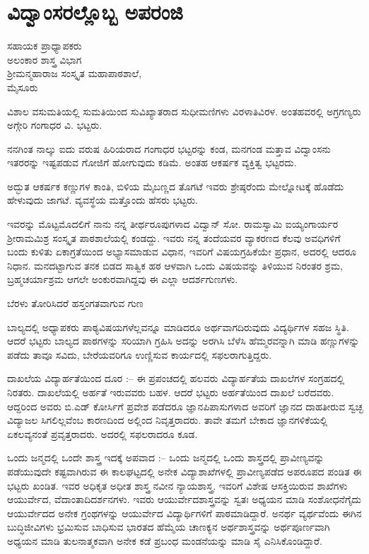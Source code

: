 \chapter{ವಿದ್ವಾಂಸರಲ್ಲೊಬ್ಬ ಅಪರಂಜಿ}

\begin{center}
\smallskip

ಸಹಾಯಕ ಪ್ರಾಧ್ಯಾಪಕರು\\
ಅಲಂಕಾರ ಶಾಸ್ತ್ರ ವಿಭಾಗ\\
ಶ್ರೀಮನ್ಮಹಾರಾಜ ಸಂಸ್ಕೃತ ಮಹಾಪಾಠಶಾಲೆ,\\ 
ಮೈಸೂರು
\addrule
\end{center}

ವಿಶಾಲ ವಸುಮತಿಯಲ್ಲಿ ಸುಮತಿಯಿಂದ ಸುವಿಖ್ಯಾತರಾದ ಸುಧೀಮಣಿಗಳು ವಿರಳಾತಿವಿರಳ.  ಅಂತಹವರಲ್ಲಿ ಅಗ್ರಗಣ್ಯರು ಅಗ್ಗೇರಿ ಗಂಗಾಧರ ವಿ. ಭಟ್ಟರು.

ನನಗಿಂತ ನಾಲ್ಕು ಐದು ವರುಷ ಹಿರಿಯರಾದ ಗಂಗಾಧರ ಭಟ್ಟರನ್ನು ಕಂಡ, ಮನಗಂಡ ಮತ್ತಾವ ವಿದ್ವಾಂಸನು ಇತರರನ್ನು ಇಷ್ಟಪಡುವ ಗೋಜಿಗೆ ಹೋಗುವುದು ಕಡಿಮೆ.  ಅಂತಹ ಆಕರ್ಷಕ ವ್ಯಕ್ತಿತ್ವ ಭಟ್ಟರದು.

ಅದ್ಭುತ ಆಕರ್ಷಕ ಕಣ್ಣುಗಳ ಕಾಂತಿ, ಬಿಳಿಯ ಮೈಬಣ್ಣದ ತೊಗಟೆ ಇವರು ಶ್ರೇಷ್ಠರೆಂದು  ಮೇಲ್ನೋಟಕ್ಕೆ ಹೊಡೆದು ಹೇಳುವುದು ಜಾಗಟೆ. ವ್ಯವಸ್ಥೆಯ ಮತ್ತೊಂದು ಹೆಸರು ಭಟ್ಟರು.

ಇವರನ್ನು ಮೊಟ್ಟಮೊದಲಿಗೆ ನಾನು ನನ್ನ ತೀರ್ಥರೂಪುಗಳಾದ ವಿದ್ವಾನ್ ಸೋ. ರಾಮಸ್ವಾಮಿ ಐಯ್ಯಂಗಾರ್ಯರ ಶ್ರೀರಾಮಮಿಶ್ರ ಸಂಸ್ಕೃತ ಪಾಠಶಾಲೆಯಲ್ಲಿ ಕಂಡದ್ದು.  ಇವರು ನನ್ನ ತಂದೆಯವರ ವ್ಯಾಕರಣದ ಕೆಲವು ಅವಧಿಗಳಿಗೆ ಬಂದು ಕುಳಿತು ಏಕಾಗ್ರತೆಯಿಂದ ಅಭ್ಯಾಸಮಾಡುವ ವಿಧಾನ, ಇವರಿಗೆ ವಿಷಯಗ್ರಹಿಕೆಯೇ ಪ್ರಧಾನ, ಅದರಲ್ಲಿ ಆದರೂ ನಿಧಾನ. ಮನದಟ್ಟಾಗುವ ತನಕ ಬಿಡದ ಸಾತ್ವಿಕ ಹಠ ಆಳವಾಗಿ ಒಂದು ವಿಷಯವನ್ನು ತಿಳಿಯುವ ನಿರಂತರ ಶ್ರಮ, ಬ್ರಹ್ಮಚರ್ಯಾಶ್ರಮ ಆಗಲೇ ಅಂಕುರವಾಗಿದ್ದವು ಈ ಎಲ್ಲಾ ಆದರ್ಶಗುಣಗಳು.

ಬೆರಳು ತೋರಿಸಿದರೆ ಹಸ್ತಂಗತವಾಗುವ ಗುಣ

ಬಾಲ್ಯದಲ್ಲಿ ಅಧ್ಯಾಪಕರು ಪಾಠ್ಯವಿಷಯಗಳೆಲ್ಲವನ್ನೂ ಮಾಡಿದರೂ ಅರ್ಥವಾಗದಿರುವುದು ವಿದ್ಯರ್ಥಿಗಳ ಸಹಜ ಸ್ಥಿತಿ.  ಆದರೆ ಭಟ್ಟರು ಬಾಲ್ಯದ ಪಾಠಗಳನ್ನು ಸರಿಯಾಗಿ ಗ್ರಹಿಸಿ ಅದನ್ನು ಅರಗಿಸಿ ಬೆಳೆಸಿ ಹೆಮ್ಮರವನ್ನಾಗಿ ಮಾಡಿ ಹಣ್ಣುಗಳನ್ನು ಪಡೆದು ತಾವೂ ಸವಿದು, ಬೇರೆಯವರಿಗೂ ಉಣ್ಣಿಸುವ ಕಾರ್ಯದಲ್ಲಿ ಸಫಲರಾಗುತ್ತಿದ್ದರು.

ದಾಖಲೆಯ ವಿದ್ಯಾರ್ಹತೆಯಿಂದ ದೂರ :– ಈ ಪ್ರಪಂಚದಲ್ಲಿ ಹಲವರು ವಿದ್ಯಾರ್ಹತೆಯ ದಾಖಲೆಗಳ ಸಂಗ್ರಹದಲ್ಲಿ ನಿರತರು.  ದಾಖಲೆಯಲ್ಲಿ ಅರ್ಹತೆ ಇರುವವರು ಬಹಳ.  ಆದರೆ ಭಟ್ಟರು ಅರ್ಹತೆಯಿಂದ ದಾಖಲೆ ಬರೆದವರು.  ಆದ್ದರಿಂದ ಅವರು ಬಿ.ಎಡ್ ಕೋರ್ಸಿಗೆ ಪ್ರವೇಶ ಪಡೆದರೂ ಜ್ಞಾನಪಿಪಾಸುಗಳಾದ ಅವರಿಗೆ ಜ್ಞಾನದ ದಾಹತೀರುವ ಸ್ವಚ್ಛ ವಿದ್ಯಾಜಲ ಸಿಗಲಿಲ್ಲವೆಂಬ ಕಾರಣದಿಂದ ಅಲ್ಲಿಂದ ನಿವೃತ್ತರಾದರು.  ತಾವೇ ತಮಗೆ ಬೇಕಾದ ಜ್ಞಾನಗಳಿಕೆಯಲ್ಲಿ ಏಕಲವ್ಯನಂತೆ ಪ್ರವೃತ್ತರಾದರು.  ಅದರಲ್ಲಿ ಸಫಲರಾದರೂ ಕೂಡ.

ಒಂದು ಜನ್ಮದಲ್ಲಿ ಒಂದೇ ಶಾಸ್ತ್ರ ಇದಕ್ಕೆ ಅಪವಾದ :– ಒಂದು ಜನ್ಮದಲ್ಲಿ ಒಂದು ಶಾಸ್ತ್ರದಲ್ಲಿ ಪ್ರಾವೀಣ್ಯವನ್ನು ಪಡೆಯುವುದೇ ಕಷ್ಟವಾಗಿರುವ ಈ ಕಾಲಘಟ್ಟದಲ್ಲಿ ಅನೇಕ ವಿದ್ಯಾಶಾಖೆಗಳಲ್ಲಿ ಪ್ರಾವೀಣ್ಯಪಡೆದ ಅಪರೂಪದ ಪಂಡಿತ ಈ ಭಟ್ಟರು ಖಂಡಿತ.  ಇವರ ಅಧಿಕೃತ ಅಧೀತ ಶಾಸ್ತ್ರ ನವೀನ ನ್ಯಾಯಶಾಸ್ತ್ರ.  ಇವರಿಗೆ ವಿಶೇಷ ಆಸಕ್ತಿಯಿರುವ ಶಾಖೆಗಳು ಆಯುರ್ವೇದ, ವೆದಾಂತಾದಿದರ್ಶನಗಳು.  ಇವರು ಆಯುರ್ವೇದಶಾಸ್ತ್ರವನ್ನು ಸ್ವತಃ ಅಧ್ಯಯನ ಮಾಡಿ ಸಂಶೋಧನೆಗೈದು ಆಯುರ್ವೇದದ ಅನೇಕ ಗ್ರಂಥಗಳನ್ನು ಆಯುರ್ವೇದ ವಿದ್ಯಾರ್ಥಿಗಳಿಗೆ ಪಾಠಮಾಡಿದ್ದಾರೆ.  ಅನರ್ಥ ವ್ಯರ್ಥವೆಂದು ಈಗಿನ ಬುದ್ಧಿಜೀವಿಗಳು ಭ್ರಮಿಸುವ ಬಾಧಿಸುವ ಭಾರತದ ಹೆಮ್ಮೆಯ ಚಾಣಕ್ಯನ ಅರ್ಥಶಾಸ್ತ್ರವನ್ನು ಅರ್ಥಪೂರ್ಣವಾಗಿ ಅಧ್ಯಯನ ಮಾಡಿ ತುಲನಾತ್ಮಕವಾಗಿ ಅನೇಕ ಕಡೆ ಪ್ರಬಂಧ ಮಂಡನೆಯನ್ನು ಮಾಡಿ ಸೈ ಎನಿಸಿಕೊಂಡಿದ್ದಾರೆ.

